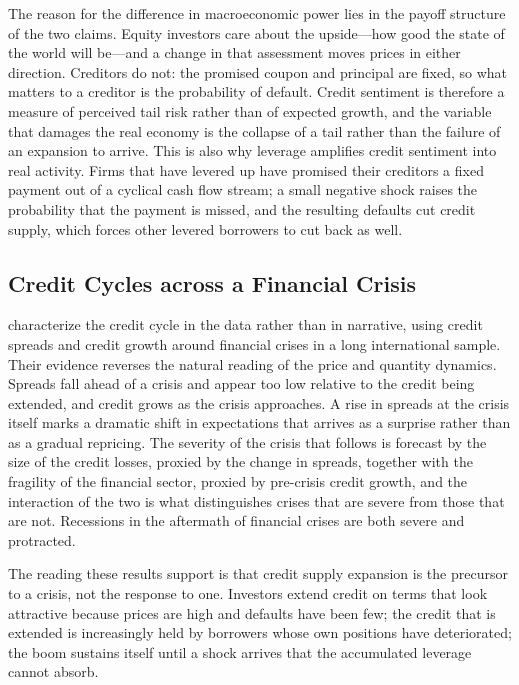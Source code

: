 The reason for the difference in macroeconomic power lies in the payoff structure of the two claims. Equity investors care about the upside---how good the state of the world will be---and a change in that assessment moves prices in either direction. Creditors do not: the promised coupon and principal are fixed, so what matters to a creditor is the probability of default. Credit sentiment is therefore a measure of perceived tail risk rather than of expected growth, and the variable that damages the real economy is the collapse of a tail rather than the failure of an expansion to arrive. This is also why leverage amplifies credit sentiment into real activity. Firms that have levered up have promised their creditors a fixed payment out of a cyclical cash flow stream; a small negative shock raises the probability that the payment is missed, and the resulting defaults cut credit supply, which forces other levered borrowers to cut back as well.

\subsection{Credit Cycles across a Financial Crisis}

\citet{krishnamurthy2025} characterize the credit cycle in the data rather than in narrative, using credit spreads and credit growth around financial crises in a long international sample. Their evidence reverses the natural reading of the price and quantity dynamics. Spreads fall ahead of a crisis and appear too low relative to the credit being extended, and credit grows as the crisis approaches. A rise in spreads at the crisis itself marks a dramatic shift in expectations that arrives as a surprise rather than as a gradual repricing. The severity of the crisis that follows is forecast by the size of the credit losses, proxied by the change in spreads, together with the fragility of the financial sector, proxied by pre-crisis credit growth, and the interaction of the two is what distinguishes crises that are severe from those that are not. Recessions in the aftermath of financial crises are both severe and protracted.

The reading these results support is that credit supply expansion is the precursor to a crisis, not the response to one. Investors extend credit on terms that look attractive because prices are high and defaults have been few; the credit that is extended is increasingly held by borrowers whose own positions have deteriorated; the boom sustains itself until a shock arrives that the accumulated leverage cannot absorb.

